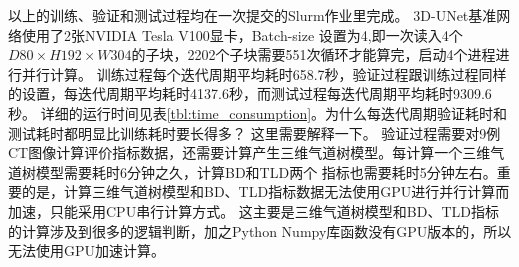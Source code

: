 以上的训练、验证和测试过程均在一次提交的Slurm作业里完成。 3D-UNet基准网络使用了2张NVIDIA Tesla V100显卡，Batch-size
设置为4,即一次读入4个$D80 \times H192 \times W304$的子块，2202个子块需要551次循环才能算完，启动4个进程进行并行计算。
训练过程每个迭代周期平均耗时658.7秒，验证过程跟训练过程同样的设置，每迭代周期平均耗时4137.6秒，而测试过程每迭代周期平均耗时9309.6秒。
详细的运行时间见表\ref{tbl:time_consumption}。为什么每迭代周期验证耗时和测试耗时都明显比训练耗时要长得多？ 这里需要解释一下。
验证过程需要对9例CT图像计算评价指标数据，还需要计算产生三维气道树模型。每计算一个三维气道树模型需要耗时6分钟之久，计算BD和TLD两个
指标也需要耗时5分钟左右。重要的是，计算三维气道树模型和BD、TLD指标数据无法使用GPU进行并行计算而加速，只能采用CPU串行计算方式。
这主要是三维气道树模型和BD、TLD指标的计算涉及到很多的逻辑判断，加之Python Numpy库函数没有GPU版本的，所以无法使用GPU加速计算。
